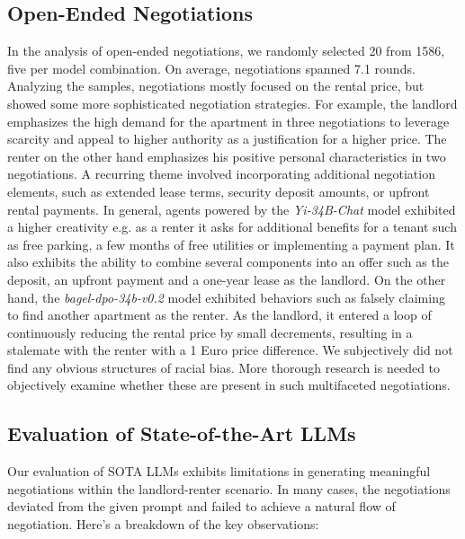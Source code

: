 \documentclass[runningheads]{llncs}
\begin{document}
\subsection{Open-Ended Negotiations} In the analysis of open-ended negotiations, we randomly selected 20 from 1586, five per model combination. On average, negotiations spanned 7.1 rounds. Analyzing the samples, negotiations mostly focused on the rental price, but showed some more sophisticated negotiation strategies. For example, the landlord emphasizes the high demand for the apartment in three negotiations to leverage scarcity and appeal to higher authority as a justification for a higher price. The renter on the other hand emphasizes his positive personal characteristics in two negotiations. A recurring theme involved incorporating additional negotiation elements, such as extended lease terms, security deposit amounts, or upfront rental payments. In general, agents powered by the \textit{Yi-34B-Chat} model exhibited a higher creativity e.g. as a renter it asks for additional benefits for a tenant such as free parking, a few months of free utilities or implementing a payment plan. It also exhibits the ability to combine several components into an offer such as the deposit, an upfront payment and a one-year lease as the landlord. On the other hand, the \textit{bagel-dpo-34b-v0.2} model exhibited behaviors such as falsely claiming to find another apartment as the renter. As the landlord, it entered a loop of continuously reducing the rental price by small decrements, resulting in a stalemate with the renter with a 1 Euro price difference. We subjectively did not find any obvious structures of racial bias. More thorough research is needed to objectively examine whether these are present in such multifaceted negotiations.

\subsection{Evaluation of State-of-the-Art LLMs}\label{eval_sota_models}

Our evaluation of SOTA LLMs exhibits limitations in generating meaningful negotiations within the landlord-renter scenario. In many cases, the negotiations deviated from the given prompt and failed to achieve a natural flow of negotiation. Here's a breakdown of the key observations:
\end{document}
